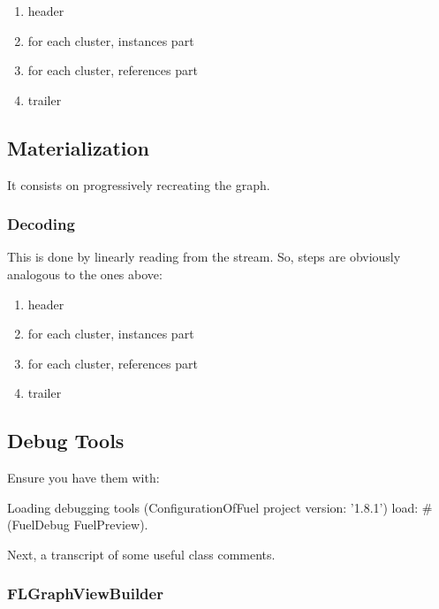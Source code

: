 \documentclass[a4paper,10pt,twoside]{book}
\begin{document}
\begin{enumerate}

\item header

\item for each cluster, instances part

\item for each cluster, references part

\item trailer

\end{enumerate}


\subsection{Materialization}

It consists on progressively recreating the graph.


\subsubsection{Decoding}
This is done by linearly reading from the stream. So, steps are obviously analogous to the ones above:


\begin{enumerate}

\item header

\item for each cluster, instances part
\item for each cluster, references part
\item trailer

\end{enumerate}


\subsection{Debug Tools}
Ensure you have them with:


\begin{code}{Loading debugging tools}
(ConfigurationOfFuel project version: '1.8.1') 
    load: #(FuelDebug FuelPreview).
\end{code}

Next, a transcript of some useful class comments. 


\subsubsection{FLGraphViewBuilder}
\end{document}
